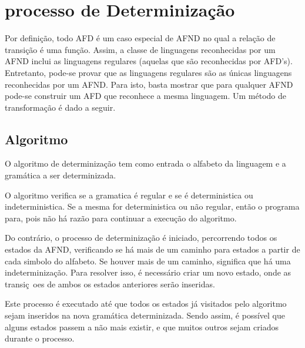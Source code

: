 \documentclass[10pt,a4paper,titlepage]{hitec}
\begin{document}
\section*{processo de Determinização}

Por definição, todo AFD é um caso especial de AFND no qual a relação de transição é uma função.
Assim, a classe de linguagens reconhecidas por um AFND inclui as linguagens regulares (aquelas que são reconhecidas por AFD's).
Entretanto, pode-se provar que as linguagens regulares são as únicas linguagens reconhecidas por um AFND. 
Para isto, basta mostrar que para qualquer AFND pode-se construir um AFD que reconhece a mesma linguagem. 
Um método de transformação é dado a seguir.

\subsection*{Algoritmo}

O algoritmo de determinização tem como entrada o alfabeto da linguagem e a gramática a ser determinizada.

O algoritmo verifica se a gramatica é regular e se é deterministica ou indeterministica. Se a mesma for deterministica ou não regular, então o programa para, pois não há razão para continuar  a execução do algoritmo.

Do contrário, o processo de determinização é iniciado, percorrendo todos os estados da AFND, verificando se há mais de um caminho para estados a partir de cada simbolo do alfabeto. Se houver mais de um caminho, significa que há uma indeterminização. Para resolver isso, é necessário criar um novo estado, onde as transiç~oes de ambos os estados anteriores serão inseridas.

Este processo é executado até que todos os estados já visitados pelo algoritmo sejam inseridos na nova gramática determinizada. Sendo assim, é possível que alguns estados passem a não mais existir, e que muitos outros sejam criados durante o processo.
\end{document}
